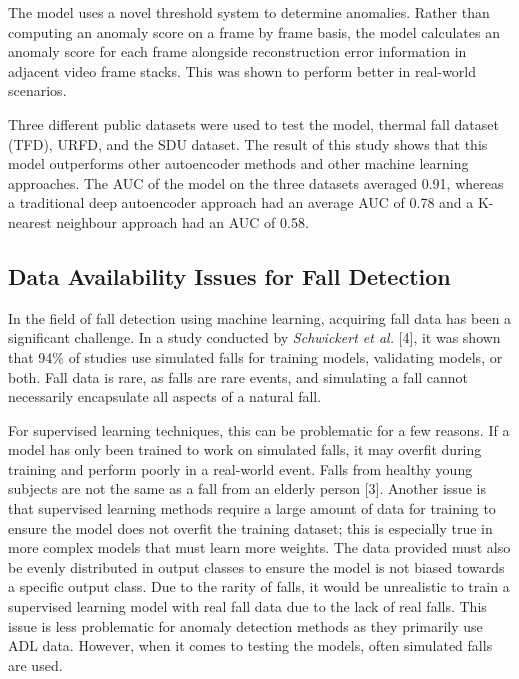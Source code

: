 The model uses a novel threshold system to determine anomalies. Rather than computing an anomaly score on a frame by frame basis, the model calculates an anomaly score for each frame alongside reconstruction error information in adjacent video frame stacks. This was shown to perform better in real-world scenarios.  

Three different public datasets were used to test the model, thermal fall dataset (TFD), URFD, and the SDU dataset. The result of this study shows that this model outperforms other autoencoder methods and other machine learning approaches. The AUC of the model on the three datasets averaged 0.91, whereas a traditional deep autoencoder approach had an average AUC of 0.78 and a K-nearest neighbour approach had an AUC of 0.58.

\subsection{Data Availability Issues for Fall Detection}
In the field of fall detection using machine learning, acquiring fall data has been a significant challenge. In a study conducted by \textit{Schwickert et al.} [4], it was shown that 94\% of studies use simulated falls for training models, validating models, or both. Fall data is rare, as falls are rare events, and simulating a fall cannot necessarily encapsulate all aspects of a natural fall. 

For supervised learning techniques, this can be problematic for a few reasons. If a model has only been trained to work on simulated falls, it may overfit during training and perform poorly in a real-world event. Falls from healthy young subjects are not the same as a fall from an elderly person [3]. Another issue is that supervised learning methods require a large amount of data for training to ensure the model does not overfit the training dataset; this is especially true in more complex models that must learn more weights. The data provided must also be evenly distributed in output classes to ensure the model is not biased towards a specific output class. Due to the rarity of falls, it would be unrealistic to train a supervised learning model with real fall data due to the lack of real falls. This issue is less problematic for anomaly detection methods as they primarily use ADL data. However, when it comes to testing the models, often simulated falls are used. 


